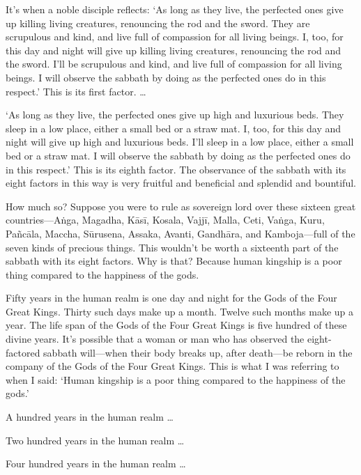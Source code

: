 \documentclass[12pt,openany]{book}%
\begin{document}
It’s when a noble disciple reflects: ‘As long as they live, the perfected ones give up killing living creatures, renouncing the rod and the sword. They are scrupulous and kind, and live full of compassion for all living beings. I, too, for this day and night will give up killing living creatures, renouncing the rod and the sword. I’ll be scrupulous and kind, and live full of compassion for all living beings. I will observe the sabbath by doing as the perfected ones do in this respect.’ This is its first factor. … 

‘As long as they live, the perfected ones give up high and luxurious beds. They sleep in a low place, either a small bed or a straw mat. I, too, for this day and night will give up high and luxurious beds. I’ll sleep in a low place, either a small bed or a straw mat. I will observe the sabbath by doing as the perfected ones do in this respect.’ This is its eighth factor. The observance of the sabbath with its eight factors in this way is very fruitful and beneficial and splendid and bountiful. 

How much so? Suppose you were to rule as sovereign lord over these sixteen great countries—\textsanskrit{Aṅga}, Magadha, \textsanskrit{Kāsī}, Kosala, \textsanskrit{Vajjī}, Malla, Ceti, \textsanskrit{Vaṅga}, Kuru, \textsanskrit{Pañcāla}, Maccha, \textsanskrit{Sūrusena}, Assaka, Avanti, \textsanskrit{Gandhāra}, and Kamboja—full of the seven kinds of precious things. This wouldn’t be worth a sixteenth part of the sabbath with its eight factors. Why is that? Because human kingship is a poor thing compared to the happiness of the gods. 

Fifty years in the human realm is one day and night for the Gods of the Four Great Kings. Thirty such days make up a month. Twelve such months make up a year. The life span of the Gods of the Four Great Kings is five hundred of these divine years. It’s possible that a woman or man who has observed the eight-factored sabbath will—when their body breaks up, after death—be reborn in the company of the Gods of the Four Great Kings. This is what I was referring to when I said: ‘Human kingship is a poor thing compared to the happiness of the gods.’ 

A hundred years in the human realm … 

Two hundred years in the human realm … 

Four hundred years in the human realm … 
\end{document}

